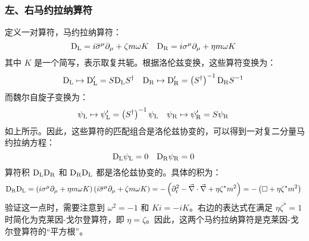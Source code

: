 \subsubsection{左、右马约拉纳算符}  
定义一对算符，马约拉纳算符：
\[
\mathrm{D}_{\rm{L}} = i {\overline{\sigma}}^{\mu} \partial_{\mu} + \zeta m \omega K \quad \mathrm{D}_{\rm{R}} = i \sigma^{\mu} \partial_{\mu} + \eta m \omega K~
\]
其中 \( K \) 是一个简写，表示取复共轭。根据洛伦兹变换，这些算符变换为：
\[
\mathrm{D}_{\rm{L}} \mapsto \mathrm{D}_{\rm{L}}' = S \mathrm{D}_{\rm{L}} S^{\dagger} \quad \mathrm{D}_{\rm{R}} \mapsto \mathrm{D}_{\rm{R}}' = \left( S^{\dagger} \right)^{-1} \mathrm{D}_{\rm{R}} S^{-1}~
\]
而魏尔自旋子变换为：
\[
\psi_{\rm{L}} \mapsto \psi_{\rm{L}}' = \left( S^{\dagger} \right)^{-1} \psi_{\rm{L}} \quad \psi_{\rm{R}} \mapsto \psi_{\rm{R}}' = S \psi_{\rm{R}}~
\]
如上所示。因此，这些算符的匹配组合是洛伦兹协变的，可以得到一对复二分量马约拉纳方程：
\[
\mathrm{D}_{\rm{L}} \psi_{\rm{L}} = 0 \quad \mathrm{D}_{\rm{R}} \psi_{\rm{R}} = 0~
\]
算符积 \( \mathrm{D}_{\rm{L}} \mathrm{D}_{\rm{R}} \) 和 \( \mathrm{D}_{\rm{R}} \mathrm{D}_{\rm{L}} \) 都是洛伦兹协变的。具体的积为：
\[
\mathrm{D}_{\rm{R}} \mathrm{D}_{\rm{L}} = \left( i \sigma^{\mu} \partial_{\mu} + \eta m \omega K \right) \left( i {\overline{\sigma}}^{\mu} \partial_{\mu} + \zeta m \omega K \right)
= - \left( \partial_{t}^2 - {\vec{\nabla}} \cdot {\vec{\nabla}} + \eta \zeta^{*} m^2 \right) = - \left( \Box + \eta \zeta^{*} m^2 \right)~
\]
验证这一点时，需要注意到 \( \omega^2 = -1 \) 和 \( K i = -i K \)。右边的表达式在满足 \( \eta \zeta^{*} = 1 \) 时简化为克莱因-戈尔登算符，即 \( \eta = \zeta \)。因此，这两个马约拉纳算符是克莱因-戈尔登算符的“平方根”。

